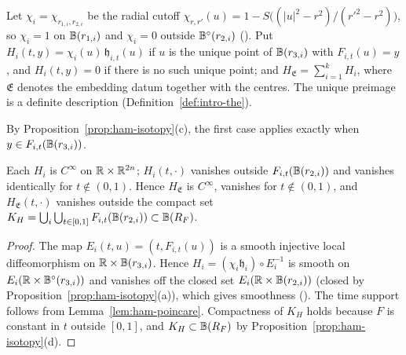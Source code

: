 \begin{definition}\label{def:ham-H}
Let $\chi_i=\chi_{r_{1,i},r_{2,i}}$ be the radial cutoff $\chi_{r,r'}(u)=1-S\big((|u|^2-r^2)/(r'^2-r^2)\big)$, so
$\chi_i=1$ on $\mathbb{B}(r_{1,i})$ and $\chi_i=0$ outside $\mathbb{B}^\circ(r_{2,i})$ (). Put
$H_i(t,y)=\chi_i(u)\,\mathfrak h_{i,t}(u)$ if $u$ is the unique point of $\mathbb{B}(r_{3,i})$ with $F_{i,t}(u)=y$, and
$H_i(t,y)=0$ if there is no such unique point; and $H_{\mathfrak E}=\sum_{i=1}^kH_i$, where $\mathfrak E$ denotes the embedding
datum together with the centres. The unique preimage is a definite description (Definition~\ref{def:intro-the}).
\end{definition}

By Proposition~\ref{prop:ham-isotopy}(c), the first case applies exactly when $y\in F_{i,t}(\mathbb{B}(r_{3,i}))$.

\begin{lemma}\label{lem:ham-smooth}
Each $H_i$ is $C^\infty$ on $\mathbb{R}\times\mathbb{R}^{2n}$; $H_i(t,\cdot)$ vanishes outside $F_{i,t}(\mathbb{B}(r_{2,i}))$ and vanishes
identically for $t\notin(0,1)$. Hence $H_{\mathfrak E}$ is $C^\infty$, vanishes for $t\notin(0,1)$, and $H_{\mathfrak E}(t,\cdot)$
vanishes outside the compact set $K_H=\bigcup_i\bigcup_{t\in[0,1]}F_{i,t}(\mathbb{B}(r_{2,i}))\subset\mathbb{B}(R_F)$.
\end{lemma}

\begin{proof}
The map $E_i(t,u)=(t,F_{i,t}(u))$ is a smooth injective local diffeomorphism on $\mathbb{R}\times\mathbb{B}(r_{3,i})$. Hence $H_i=(\chi_i\mathfrak h_i)\circ E_i^{-1}$ is smooth on $E_i(\mathbb{R}\times\mathbb{B}^\circ(r_{3,i}))$ and vanishes off the closed set $E_i(\mathbb{R}\times\mathbb{B}(r_{2,i}))$ (closed by Proposition~\ref{prop:ham-isotopy}(a)), which gives smoothness (). The time support follows from Lemma~\ref{lem:ham-poincare}. Compactness of $K_H$ holds because $F$ is constant in $t$ outside $[0,1]$, and $K_H\subset\mathbb{B}(R_F)$ by Proposition~\ref{prop:ham-isotopy}(d).
\end{proof}

